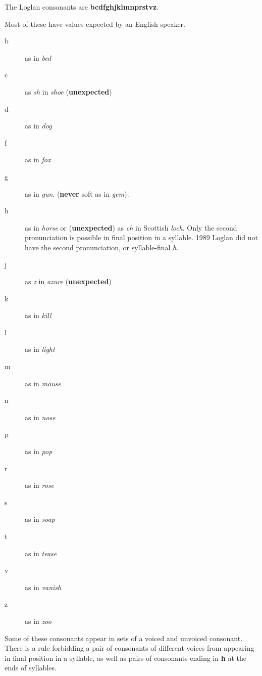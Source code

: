 \documentclass{article}
\begin{document}
The Loglan consonants are {\bf bcdfghjklmnprstvz}.

Most of these have values expected by an English speaker.

\begin{description}

\item[b]   as in {\em bed\/}

\item[c]  as {\em sh\/} in {\em shoe\/} ({\bf unexpected})

\item[d]  as in {\em dog\/}

\item[f]  as in {\em fox\/}

\item[g]  as in {\em gun}.  ({\bf never} soft as in {\em gem\/}).

\item[h]  as in {\em horse\/} or ({\bf unexpected}) as {\em ch\/} in Scottish {\em loch\/}.  Only the second pronunciation is possible in final position in a syllable.   1989 Loglan did not have the second pronunciation, or syllable-final {\em h}.

\item[j]  as {\em z\/} in {\em azure\/} ({\bf unexpected})

\item[k]  as in {\em kill\/}

\item[l]  as in {\em light\/}

\item[m]  as in {\em mouse\/}

\item[n]  as in {\em nose\/}

\item[p]  as in {\em pop\/}

\item[r]  as in {\em rose\/}

\item[s]  as in {\em soap\/}

\item[t]  as in {\em tease\/}

\item[v]  as in {\em vanish\/}

\item[z] as in {\em zoo\/}

\end{description}

Some of these consonants appear in sets of a voiced and unvoiced consonant.  There is a rule forbidding a pair of consonants of different voices from appearing in final position in a syllable, as well as pairs of consonants ending in {\bf h} at the ends of syllables.
\end{document}
